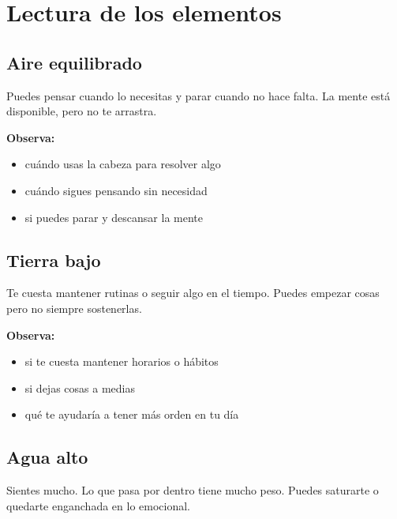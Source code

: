 \documentclass[11pt,a4paper]{article}
\begin{document}
\vspace{0.8cm}



\section{Lectura de los elementos}

\subsection{Aire equilibrado}

Puedes pensar cuando lo necesitas y parar cuando no hace falta. La mente está disponible, pero no te arrastra.

\textbf{Observa:}
\begin{itemize}
\item cuándo usas la cabeza para resolver algo
\item cuándo sigues pensando sin necesidad
\item si puedes parar y descansar la mente
\end{itemize}

\vspace{0.4cm}

\subsection{Tierra bajo}

Te cuesta mantener rutinas o seguir algo en el tiempo. Puedes empezar cosas pero no siempre sostenerlas.

\textbf{Observa:}
\begin{itemize}
\item si te cuesta mantener horarios o hábitos
\item si dejas cosas a medias
\item qué te ayudaría a tener más orden en tu día
\end{itemize}

\vspace{0.4cm}

\subsection{Agua alto}

Sientes mucho. Lo que pasa por dentro tiene mucho peso. Puedes saturarte o quedarte enganchada en lo emocional.
\end{document}
